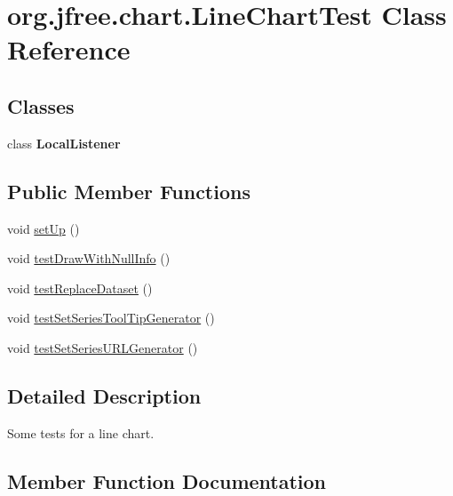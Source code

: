\hypertarget{classorg_1_1jfree_1_1chart_1_1_line_chart_test}{}\section{org.\+jfree.\+chart.\+Line\+Chart\+Test Class Reference}
\label{classorg_1_1jfree_1_1chart_1_1_line_chart_test}
\subsection*{Classes}
\begin{DoxyCompactItemize}
\item 
class {\bfseries Local\+Listener}
\end{DoxyCompactItemize}
\subsection*{Public Member Functions}
\begin{DoxyCompactItemize}
\item 
void \mbox{\hyperlink{classorg_1_1jfree_1_1chart_1_1_line_chart_test_a28f47584943e28322d1fe560161f321f}{set\+Up}} ()
\item 
void \mbox{\hyperlink{classorg_1_1jfree_1_1chart_1_1_line_chart_test_adace094c538a5e843f23b56f73ce43d6}{test\+Draw\+With\+Null\+Info}} ()
\item 
void \mbox{\hyperlink{classorg_1_1jfree_1_1chart_1_1_line_chart_test_a2f092d24aa8bde72e19c0a9788bcf780}{test\+Replace\+Dataset}} ()
\item 
void \mbox{\hyperlink{classorg_1_1jfree_1_1chart_1_1_line_chart_test_a5ee3e00b22ff88fe4b9a54a02cb1d424}{test\+Set\+Series\+Tool\+Tip\+Generator}} ()
\item 
void \mbox{\hyperlink{classorg_1_1jfree_1_1chart_1_1_line_chart_test_a48054073b6feecf7e0da43b6df30ef69}{test\+Set\+Series\+U\+R\+L\+Generator}} ()
\end{DoxyCompactItemize}


\subsection{Detailed Description}
Some tests for a line chart. 

\subsection{Member Function Documentation}
\mbox{\label{classorg_1_1jfree_1_1chart_1_1_line_chart_test_a28f47584943e28322d1fe560161f321f}} 

